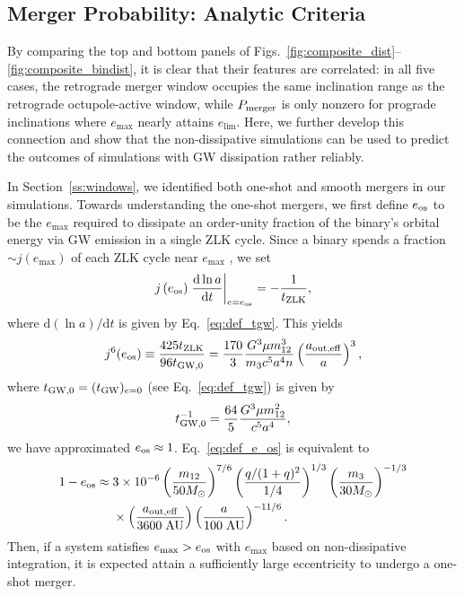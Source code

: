 \documentclass[
        fleqn,
        usenatbib,
    ]{mnras}
\newcommand*{\rd}[2]{\frac{\mathrm{d}#1}{\mathrm{d}#2}}
\newcommand*{\rdil}[2]{\mathrm{d}#1/\mathrm{d}#2}
\newcommand*{\at}[1]{\left.#1\right|}
\newcommand*{\p}[1]{\left(#1\right)}
\begin{document}
\subsection{Merger Probability: Analytic Criteria}\label{ss:nogw_merger}

By comparing the top and bottom panels of
Figs.~\ref{fig:composite_dist}--\ref{fig:composite_bindist}, it is clear that
their features are correlated: in all five cases, the retrograde merger window
occupies the same inclination range as the retrograde octupole-active window,
while $P_{\rm merger}$ is only nonzero for prograde inclinations where
$e_{\max}$ nearly attains $e_{\lim}$. Here, we further develop this connection
and show that the non-dissipative simulations can be used to predict the
outcomes of simulations with GW dissipation rather reliably.

In Section~\ref{ss:windows}, we identified both one-shot and smooth mergers in
our simulations. Towards understanding the one-shot mergers, we first define
$e_{\rm os}$ to be the $e_{\max}$ required to dissipate an order-unity fraction
of the binary's orbital energy via GW emission in a single ZLK cycle. Since a
binary spends a fraction $\sim j(e_{\max})$ of each ZLK cycle near $e_{\max}$
\citep[e.g.,][]{anderson2016formation}, we set
\begin{align}
    j\p{e_{\rm os}}\at{\rd{\ln a}{t}}_{e = e_{\rm os}} =
        -\frac{1}{t_{\rm ZLK}},
\end{align}
where $\rdil{(\ln a)}{t}$ is given by Eq.~\eqref{eq:def_tgw}. This yields
\begin{align}
    j^6(e_{\rm os}) \equiv \frac{425 t_{\rm ZLK}}{96t_{\rm GW, 0}}
        =
        \frac{170}{3}
            \frac{G^3 \mu m_{12}^3}{m_3c^5a^4n}
            \p{\frac{a_{\rm out, eff}}{a}}^3,
            \label{eq:def_e_os}
\end{align}
where $t_{\rm GW, 0} = (t_{\rm GW})_{e = 0}$ (see Eq.~\ref{eq:def_tgw}) is given
by
\begin{align}
    t_{\rm GW, 0}^{-1} = \frac{64}{5}\frac{G^3 \mu m_{12}^2}{c^5a^4},
\end{align}
we have approximated $e_{\rm os} \approx 1$. Eq.~\eqref{eq:def_e_os} is
equivalent to
\begin{align}
    1 - e_{\rm os} \approx{}& 3 \times 10^{-6}
        \p{\frac{m_{12}}{50M_{\odot}}}^{7/6}
        \p{\frac{q / (1 + q)^2}{1/4}}^{1/3}
        \p{\frac{m_3}{30M_{\odot}}}^{-1/3}\nonumber\\
        &\times \p{\frac{a_{\rm out, eff}}{3600 \;\mathrm{AU}}}
            \p{\frac{a}{100\;\mathrm{AU}}}^{-11/6}.
\end{align}
Then, if a system satisfies $e_{\max} > e_{\rm os}$ with $e_{\max}$ based on
non-dissipative integration, it is expected attain a sufficiently large
eccentricity to undergo a one-shot merger.
\end{document}
